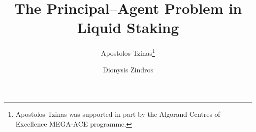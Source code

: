 \title{
  The Principal--Agent Problem in
  Liquid Staking
}
\ifanonymous{\iflncs
\author{}\institute{}
\fi}
\else
\author{
        Apostolos Tzinas\thanks{Apostolos Tzinas was supported in part by the Algorand Centres of Excellence MEGA-ACE programme.} \and
        Dionysis Zindros
}
\iflncs
{}
\else
{}
\fi
\fi
